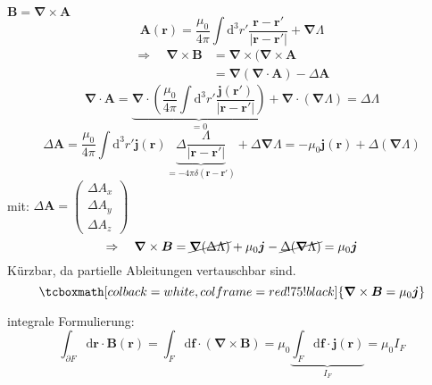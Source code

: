 \documentclass[titlepage,11pt,a4paper,ngerman]{report}
\newcommand{\tx}[1]{\textrm{#1}}
\newcommand{\ub}[1]{\underbrace{#1}}
\newcommand{\dd}{\tx{d}}
\renewcommand{\vec}[1]{\boldsymbol{#1}}
\newcommand{\vabla}{\boldsymbol{\nabla}}
\newcommand{\rmbox}[1]{\tcboxmath[colback=white,colframe=red!75!black]{#1}}
\begin{document}
$ \vec{B} = \vec{\nabla} \times \vec{A} $
\begin{equation*}
\vec{A}(\vec{r}) = \frac{\mu_0}{4 \pi} \int \dd^3 r' \frac{\vec{r} - \vec{r}'}{|\vec{r} - \vec{r}'|} + \vabla \Lambda
\end{equation*}
\begin{align*}
\Rightarrow \quad \vabla \times \vec{B} &= \vabla \times (\vabla \times \vec{A}\\
&= \vabla (\vabla \cdot \vec{A}) - \Delta \vec{A}
\end{align*}
\begin{equation*}
\vabla \cdot \vec{A} = \ub{\vabla \cdot \left(\frac{\mu_0}{4 \pi} \int \dd ^3 r' \frac{\vec{j}(\vec{r}')}{|\vec{r} - \vec{r}'|}\right)}_{=0} + \vabla \cdot (\vabla \Lambda) = \Delta \Lambda 
\end{equation*}
\begin{equation*}
\Delta \vec{A} = \frac{\mu_0}{4 \pi} \int \dd^3 r' \vec{j}(\vec{r}) \ub{\Delta \frac{\Lambda}{|\vec{r} - \vec{r}'|}}_{= - 4 \pi \delta(\vec{r} - \vec{r}')} + \Delta \vabla \Lambda = - \mu_0 \vec{j}(\vec{r}) + \Delta (\vabla \Lambda)
\end{equation*}
mit: $ \Delta \vec{A} = \begin{pmatrix}
\Delta A_x \\ \Delta A_y \\ \Delta A_z
\end{pmatrix} $
\begin{equation*}
\Rightarrow \quad \vabla \times \vec{B} = \cancel{\vabla(\Delta \Lambda)} + \mu_0 \vec{j} - \cancel{\Delta (\vabla \Lambda)} = \mu_0 \vec{j}
\end{equation*}
Kürzbar, da partielle Ableitungen vertauschbar sind.
\begin{equation*}
\rmbox{\vabla \times \vec{B} = \mu_0 \vec{j}}
\end{equation*}
\begin{minipage}{.8\linewidth}
	integrale Formulierung:
	\begin{equation*}
	\int_{\partial F} \dd \vec{r} \cdot \vec{B} (\vec{r}) = \int_F \dd \vec{f} \cdot (\vec{\nabla} \times \vec{B}) = \mu_0 \ub{\int_F \dd \vec{f} \cdot \vec{j}(\vec{r})}_{I_F} = \mu_0 I_F
	\end{equation*}
\end{minipage}%
\begin{minipage}{.2\linewidth}
	\flushright
\end{minipage}%
\end{document}
